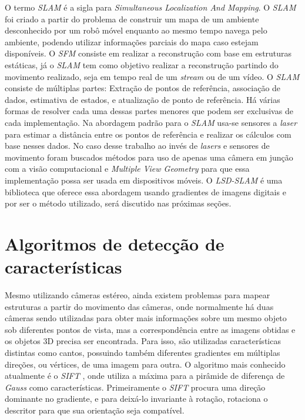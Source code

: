 O termo \textit{SLAM} é a sigla para \textit{Simultaneous Localization And Mapping}. O \textit{SLAM} foi criado a partir do problema de construir um mapa de um ambiente desconhecido por um robô móvel enquanto ao mesmo tempo navega pelo ambiente, podendo utilizar informações parciais do mapa caso estejam disponíveis. O \textit{SFM} consiste em realizar a reconstrução com base em estruturas estáticas, já o \textit{SLAM} tem como objetivo realizar a reconstrução partindo do movimento realizado, seja em tempo real de um \textit{stream} ou de um vídeo. O \textit{SLAM} consiste de múltiplas partes: Extração de pontos de referência, associação de dados, estimativa de estados, e atualização de ponto de referência. Há várias formas de resolver cada uma dessas partes menores que podem ser exclusivas de cada implementação\cite{SLAM-Dummies}. Na abordagem padrão para o \textit{SLAM} usa-se sensores a \textit{laser} para estimar a distância entre os pontos de referência e realizar os cálculos com base nesses dados. No caso desse trabalho ao invés de \textit{lasers} e sensores de movimento foram buscados métodos para uso de apenas uma câmera em junção com a visão computacional e \textit{Multiple View Geometry} para que essa implementação possa ser usada em dispositivos móveis. O \textit{LSD-SLAM} é uma biblioteca que oferece essa abordagem usando gradientes de imagens digitais e por ser o método utilizado, será discutido nas próximas seções.



\section{Algoritmos de detecção de características}
  
Mesmo utilizando câmeras estéreo, ainda existem problemas para mapear estruturas a partir do movimento das câmeras, onde normalmente há duas câmeras sendo utilizadas para obter mais informações sobre um mesmo objeto sob diferentes pontos de vista, mas a correspondência entre as imagens obtidas e os objetos 3D precisa ser encontrada. Para isso, são utilizadas características distintas como cantos, possuindo também diferentes gradientes em múltiplas direções, ou vértices, de uma imagem para outra. O algoritmo mais conhecido atualmente é o \textit{SIFT} \cite{SIFT}, onde utiliza a máxima para a pirâmide de diferença de \textit{Gauss} \cite{Gauss} como características. Primeiramente o \textit{SIFT} procura uma direção dominante no gradiente, e para deixá-lo invariante à rotação, rotaciona o descritor para que sua orientação seja compatível.
  
